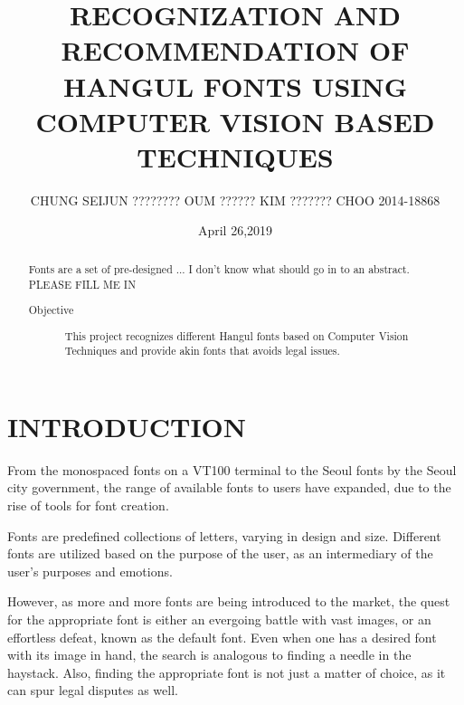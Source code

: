 \documentclass[%
 reprint,
nofootinbib,
nobibnotes,
amsmath,amssymb,
aps,
]{revtex4-1}
\begin{document}

\title{RECOGNIZATION AND RECOMMENDATION OF HANGUL FONTS USING COMPUTER VISION BASED
TECHNIQUES}%

\author{CHUNG SEIJUN ???????? OUM ?????? KIM  ??????? CHOO 2014-18868   }
%
\date{April 26,2019}

\begin{abstract}
  Fonts are a set of pre-designed ... I don't know what should go in to an
  abstract. PLEASE FILL ME IN
\begin{description}
\item[Objective]
This project recognizes different Hangul fonts based on Computer Vision
    Techniques and provide akin fonts that avoids legal issues.
\end{description}
\end{abstract}

\maketitle


\section{\label{sec:level1}INTRODUCTION}
From the monospaced fonts on a VT100 terminal to the
Seoul fonts by the Seoul city government, the range of available fonts to users have expanded, due to the rise of tools for font creation.

Fonts are predefined collections of letters, varying in design and size.
Different fonts are utilized based on the purpose of the user, as an
intermediary of the user's purposes and emotions.

However, as more and more fonts are being introduced to the market, the quest
for the appropriate font is either an evergoing battle with vast images,
or an effortless defeat, known as the default font. Even when one has a
desired font with its image in hand, the search is analogous to finding a needle in the
haystack. Also, finding the appropriate font is not just a matter of choice, as it can spur legal
disputes as well.\cite{lawsuit}
\end{document}
